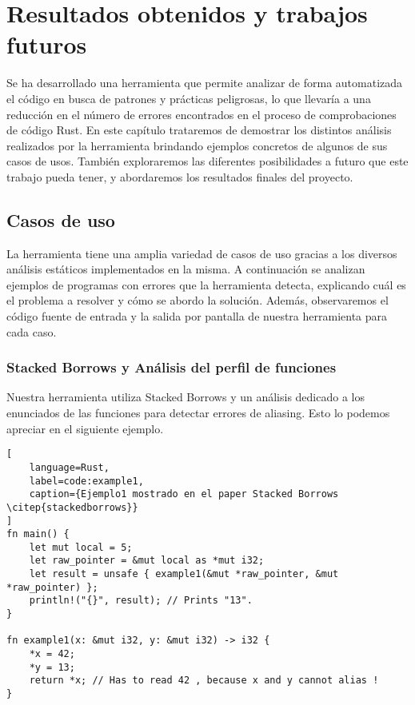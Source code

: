 \chapter{Resultados obtenidos y trabajos futuros}

Se ha desarrollado una herramienta que permite analizar de forma automatizada el código en busca de patrones y prácticas peligrosas, lo que llevaría a una reducción en el número de errores encontrados en el proceso de comprobaciones de código Rust. En este capítulo trataremos de demostrar los distintos análisis realizados por la herramienta brindando ejemplos concretos de algunos de sus casos de usos. También exploraremos las diferentes posibilidades a futuro que este trabajo pueda tener, y abordaremos los resultados finales del proyecto. 

\section{Casos de uso}

La herramienta tiene una amplia variedad de casos de uso gracias a los diversos análisis estáticos implementados en la misma. A continuación se analizan ejemplos de programas con errores que la herramienta detecta, explicando cuál es el problema a resolver y cómo se abordo la solución. Además, observaremos el código fuente de entrada y la salida por pantalla de nuestra herramienta para cada caso.

\subsection{Stacked Borrows y Análisis del perfil de funciones}
Nuestra herramienta utiliza Stacked Borrows y un análisis dedicado a los enunciados de las funciones para detectar errores de aliasing. Esto lo podemos apreciar en el siguiente ejemplo.

\begin{lstlisting}[
    language=Rust,
    label=code:example1,
    caption={Ejemplo1 mostrado en el paper Stacked Borrows \citep{stackedborrows}}
]
fn main() {
    let mut local = 5;
    let raw_pointer = &mut local as *mut i32;
    let result = unsafe { example1(&mut *raw_pointer, &mut *raw_pointer) };
    println!("{}", result); // Prints "13".
}

fn example1(x: &mut i32, y: &mut i32) -> i32 {
    *x = 42;
    *y = 13;
    return *x; // Has to read 42 , because x and y cannot alias !
}
\end{lstlisting}

